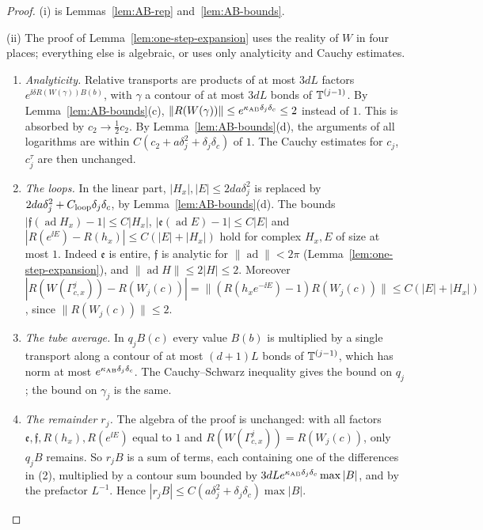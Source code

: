 \begin{proof}
(i) is Lemmas~\ref{lem:AB-rep} and~\ref{lem:AB-bounds}.

(ii) The proof of Lemma~\ref{lem:one-step-expansion} uses the reality of $W$ in four places; everything else is algebraic, or uses only analyticity and Cauchy estimates.
\begin{enumerate}[label=(\arabic*)]
\item \emph{Analyticity.} Relative transports are products of at most $3dL$ factors $e^{\ii\delta R(W(\gamma))B(b)}$, with $\gamma$ a contour of at most $3dL$ bonds of $\mathbb T^{(j-1)}$. By Lemma~\ref{lem:AB-bounds}(c), $\|R(W(\gamma))\|\le e^{\kappa_{\rm AB}\delta_j\delta_c}\le2$ instead of $1$. This is absorbed by $c_2\to\frac12c_2$. By Lemma~\ref{lem:AB-bounds}(d), the arguments of all logarithms are within $C(c_2+a\delta_j^2+\delta_j\delta_c)$ of $1$. The Cauchy estimates for $c_j$, $c^\tau_j$ are then unchanged.
\item \emph{The loops.} In the linear part, $|H_x|,|E|\le2da\delta_j^2$ is replaced by $2da\delta_j^2+C_{\rm loop}\delta_j\delta_c$, by Lemma~\ref{lem:AB-bounds}(d). The bounds $|\mathfrak f(\operatorname{ad}H_x)-1|\le C|H_x|$, $|\mathfrak e(\operatorname{ad}E)-1|\le C|E|$ and $|R(e^{\ii E})-R(h_x)|\le C(|E|+|H_x|)$ hold for complex $H_x,E$ of size at most $1$. Indeed $\mathfrak e$ is entire, $\mathfrak f$ is analytic for $\|\operatorname{ad}\|<2\pi$ (Lemma~\ref{lem:one-step-expansion}), and $\|\operatorname{ad}H\|\le2|H|\le2$. Moreover $|R(W(\Gamma^j_{c,x}))-R(W_j(c))|=\|(R(h_xe^{-\ii E})-1)R(W_j(c))\|\le C(|E|+|H_x|)$, since $\|R(W_j(c))\|\le2$.
\item \emph{The tube average.} In $q_jB(c)$ every value $B(b)$ is multiplied by a single transport along a contour of at most $(d+1)L$ bonds of $\mathbb T^{(j-1)}$, which has norm at most $e^{\kappa_{\rm AB}\delta_j\delta_c}$. The Cauchy--Schwarz inequality gives the bound on $q_j$; the bound on $\gamma_j$ is the same.
\item \emph{The remainder $r_j$.} The algebra of the proof is unchanged: with all factors $\mathfrak e,\mathfrak f,R(h_x),R(e^{\ii E})$ equal to $1$ and $R(W(\Gamma^j_{c,x}))=R(W_j(c))$, only $q_jB$ remains. So $r_jB$ is a sum of terms, each containing one of the differences in (2), multiplied by a contour sum bounded by $3dLe^{\kappa_{\rm AB}\delta_j\delta_c}\max|B|$, and by the prefactor $L^{-1}$. Hence $|r_jB|\le C(a\delta_j^2+\delta_j\delta_c)\max|B|$.
\end{enumerate}


\end{proof}
